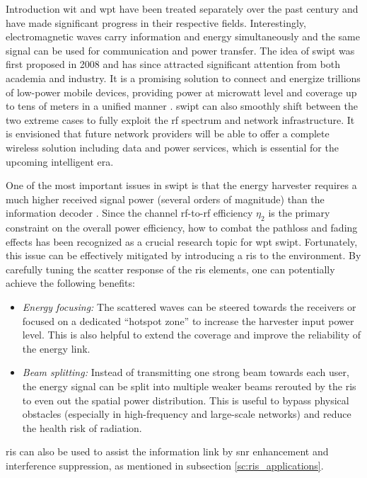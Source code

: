 \begin{section}{}\label{sc:swipt}
	\begin{subsection}{Introduction}
		\gls{wit} and \gls{wpt} have been treated separately over the past century and have made significant progress in their respective fields.
		Interestingly, electromagnetic waves carry information and energy simultaneously and the same signal can be used for communication and power transfer.
		The idea of \gls{swipt} was first proposed in 2008 \cite{Varshney2008} and has since attracted significant attention from both academia and industry.
		It is a promising solution to connect and energize trillions of low-power mobile devices, providing power at microwatt level and coverage up to tens of meters in a unified manner \cite{Clerckx2018b}.
		\gls{swipt} can also smoothly shift between the two extreme cases to fully exploit the \gls{rf} spectrum and network infrastructure.
		It is envisioned that future network providers will be able to offer a complete wireless solution including data and power services, which is essential for the upcoming intelligent era.

		One of the most important issues in \gls{swipt} is that the energy harvester requires a much higher received signal power (several orders of magnitude) than the information decoder \cite{Clerckx2019}.
		Since the channel \gls{rf}-to-\gls{rf} efficiency $\eta_2$ is the primary constraint on the overall power efficiency, how to combat the pathloss and fading effects has been recognized as a crucial research topic for \gls{wpt} \gls{swipt}.
		Fortunately, this issue can be effectively mitigated by introducing a \gls{ris} to the environment.
		By carefully tuning the scatter response of the \gls{ris} elements, one can potentially achieve the following benefits:
		\begin{itemize}
			\item \emph{Energy focusing:} The scattered waves can be steered towards the receivers or focused on a dedicated ``hotspot zone'' to increase the harvester input power level. This is also helpful to extend the coverage and improve the reliability of the energy link.
			\item \emph{Beam splitting:} Instead of transmitting one strong beam towards each user, the energy signal can be split into multiple weaker beams rerouted by the \gls{ris} to even out the spatial power distribution. This is useful to bypass physical obstacles (especially in high-frequency and large-scale networks) and reduce the health risk of radiation.
		\end{itemize}
		\gls{ris} can also be used to assist the information link by \gls{snr} enhancement and interference suppression, as mentioned in subsection \ref{sc:ris_applications}.
	\end{subsection}


\end{section}

